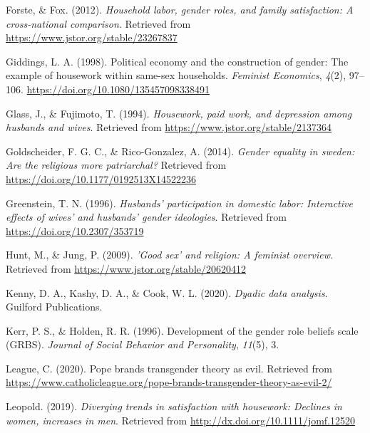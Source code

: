 \documentclass[
  man,floatsintext]{apa6}
\newlength{\cslhangindent}
\newlength{\cslentryspacingunit} %
\newenvironment{CSLReferences}[2] %
 {%
  \setlength{\parindent}{0pt}
  \ifodd #1
  \let\oldpar\par
  \def\par{\hangindent=\cslhangindent\oldpar}
  \fi
  \setlength{\parskip}{#2\cslentryspacingunit}
 }%
 {}
\begin{document}
\begin{CSLReferences}{1}{0}
\leavevmode{}%
Forste, \& Fox. (2012). \emph{Household labor, gender roles, and family satisfaction: A cross-national comparison}. Retrieved from \url{https://www.jstor.org/stable/23267837}

\leavevmode{}%
Giddings, L. A. (1998). Political economy and the construction of gender: The example of housework within same-sex households. \emph{Feminist Economics}, \emph{4}(2), 97--106. \url{https://doi.org/10.1080/135457098338491}

\leavevmode{}%
Glass, J., \& Fujimoto, T. (1994). \emph{Housework, paid work, and depression among husbands and wives}. Retrieved from \url{https://www.jstor.org/stable/2137364}

\leavevmode{}%
Goldscheider, F. G. C., \& Rico-Gonzalez, A. (2014). \emph{Gender equality in sweden: Are the religious more patriarchal?} Retrieved from \url{https://doi.org/10.1177/0192513X14522236}

\leavevmode{}%
Greenstein, T. N. (1996). \emph{Husbands' participation in domestic labor: Interactive effects of wives' and husbands' gender ideologies}. Retrieved from \url{https://doi.org/10.2307/353719}

\leavevmode{}%
Hunt, M., \& Jung, P. (2009). \emph{'Good sex' and religion: A feminist overview}. Retrieved from \url{https://www.jstor.org/stable/20620412}

\leavevmode{}%
Kenny, D. A., Kashy, D. A., \& Cook, W. L. (2020). \emph{Dyadic data analysis}. Guilford Publications.

\leavevmode{}%
Kerr, P. S., \& Holden, R. R. (1996). Development of the gender role beliefs scale (GRBS). \emph{Journal of Social Behavior and Personality}, \emph{11}(5), 3.

\leavevmode{}%
League, C. (2020). Pope brands transgender theory as evil. Retrieved from \url{https://www.catholicleague.org/pope-brands-transgender-theory-as-evil-2/}

\leavevmode{}%
Leopold. (2019). \emph{Diverging trends in satisfaction with housework: Declines in women, increases in men}. Retrieved from \url{http://dx.doi.org/10.1111/jomf.12520}


\end{CSLReferences}
\end{document}

